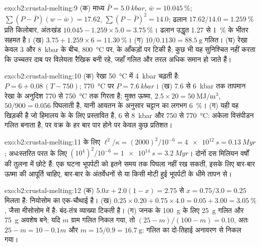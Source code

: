 \begin{solution}{exo:b2:crustal-melting:9}
(क) माध्य $\bar P = \qty{5.0}{kbar}$, $\bar w = \qty{10.045}{\percent}$;
$\sum(P - \bar P)(w - \bar w) = 17.62$, $\sum(P - \bar P)^2 = 14.0$; ढलान
$17.62/14.0 = \qty{1.259}{\percent}$ प्रति किलोबार, अंतःखंड $10.045 - 1.259\times5.0 =
\qty{3.75}{\percent}$। ढलान उद्धृत 1.27 से
\qty{1}{\percent} के भीतर सहमत है। (ख) $3.75 + 1.259\times6 = \qty{11.30}{\percent}$। (ग) $10/0.1130 =
\qty{88.5}{\gram}$ गलित। (घ) रेखा केवल 3 और \qty{8}{kbar} के बीच,
\qty{800}{\celsius} पर, के आँकड़ों पर टिकी है; कुछ भी यह सुनिश्चित नहीं करता कि उच्चतर दाब पर विलेयता रैखिक बनी रहे,
जहाँ गलित और तरल अधिक समान हो जाते हैं।
\end{solution}

\begin{solution}{exo:b2:crustal-melting:10}
(क) रेखा \qty{50}{\celsius} में \qty{4}{kbar} चढ़ती है: $P = 6 + 0.08\,(T - 750)$;
\qty{770}{\celsius} पर $P = \qty{7.6}{kbar}$। (ख) 7.6 से \qty{6}{kbar} तक
तापमान रेखा के अनुदिश 770 से \qty{750}{\celsius} तक गिरता है; मुक्त ऊष्मा,
$2.5\times20 = \qty{50}{\mega\joule\per\cubic\metre}$, $50/900 = 0.056$ पिघलाती है, यानी आयतन के अनुसार चट्टान का लगभग
\qty{6}{\percent}। (ग) यही वह खिड़की है जो
हिमालय के  के लिए प्रस्तावित है, 6 से \qty{8}{kbar} और 750 से \qty{770}{\celsius}: अकेला विसंपीडन
गलित बनाता है, पर वक्र के हर बार पार होने पर केवल कुछ प्रतिशत।
\end{solution}

\begin{solution}{exo:b2:crustal-melting:11}
 के लिए $\ell^2/\kappa = (2000)^2/10^{-6} = \qty{4e12}{s} = \qty{0.13}{Myr}$;
अधःस्तरित परत के लिए $(10^4)^2/10^{-6} = \qty{1e14}{s} = \qty{3.2}{Myr}$। दोनों
दस मिलियन वर्षों की तुलना में छोटे हैं: एक घटना भूपर्पटी को इतने समय तक पिघला नहीं रख सकती, इसके लिए
बार-बार ऊष्मा की आपूर्ति चाहिए, बार-बार के अंतर्वेधनों से या किसी
मोटी हुई भूपर्पटी के धीमे तापन से।
\end{solution}

\begin{solution}{exo:b2:crustal-melting:12}
(क) $5.0x + 2.0(1 - x) = 2.75$ से $x = 0.75/3.0 = 0.25$ मिलता है: नियोसोम का एक-चौथाई
 है। (ख) $0.25\times0.20 + 0.75\times4.0 = 0.05 + 3.00 = \qty{3.05}{\percent}$, जैसा
मीसोसोम में है: बंद-तंत्र व्याख्या टिकती है। (ग) जनक के \qty{100}{\gram} के लिए
\qty{25}{\gram} गलित और \qty{75}{\gram} अवशेष बने; यदि $m$ ग्राम
गलित निकल गया, तो $(25 - m)/(100 - m) = 0.10$, अतः $25 - m = 10 - 0.1m$ और $m = 15/0.9 =
\qty{16.7}{\gram}$: गलित का दो-तिहाई अनावरण से निकल गया।
\end{solution}

